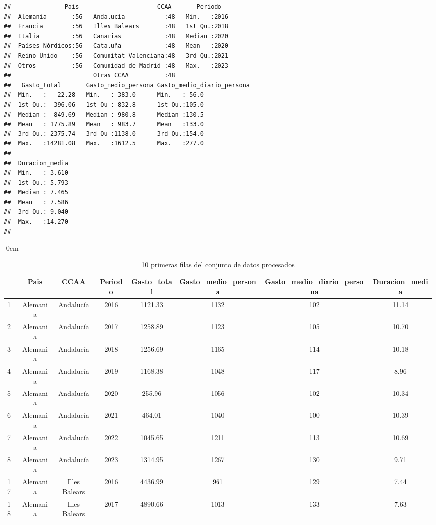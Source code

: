 \documentclass[data,article,submit,moreauthors,pdftex]{Definitions/mdpi}
\begin{document}
\begin{verbatim}
##               Pais                      CCAA       Periodo    
##  Alemania       :56   Andalucía           :48   Min.   :2016  
##  Francia        :56   Illes Balears       :48   1st Qu.:2018  
##  Italia         :56   Canarias            :48   Median :2020  
##  Países Nórdicos:56   Cataluña            :48   Mean   :2020  
##  Reino Unido    :56   Comunitat Valenciana:48   3rd Qu.:2021  
##  Otros          :56   Comunidad de Madrid :48   Max.   :2023  
##                       Otras CCAA          :48                 
##   Gasto_total       Gasto_medio_persona Gasto_medio_diario_persona
##  Min.   :   22.28   Min.   : 383.0      Min.   : 56.0             
##  1st Qu.:  396.06   1st Qu.: 832.8      1st Qu.:105.0             
##  Median :  849.69   Median : 980.8      Median :130.5             
##  Mean   : 1775.89   Mean   : 983.7      Mean   :133.0             
##  3rd Qu.: 2375.74   3rd Qu.:1138.0      3rd Qu.:154.0             
##  Max.   :14281.08   Max.   :1612.5      Max.   :277.0             
##                                                                   
##  Duracion_media  
##  Min.   : 3.610  
##  1st Qu.: 5.793  
##  Median : 7.465  
##  Mean   : 7.586  
##  3rd Qu.: 9.040  
##  Max.   :14.270  
## 
\end{verbatim}

\begin{table}[H]

\caption{\label{tab:unnamed-chunk-27} 10 primeras filas del conjunto de datos procesados}
             \begin{adjustwidth}{-\extralength}{0cm}
             \small
\begin{tabular}[t]{lccccccc}
\toprule
  & Pais & CCAA & Periodo & Gasto\_total & Gasto\_medio\_persona & Gasto\_medio\_diario\_persona & Duracion\_media\\
\midrule
1 & Alemania & Andalucía & 2016 & 1121.33 & 1132 & 102 & 11.14\\
2 & Alemania & Andalucía & 2017 & 1258.89 & 1123 & 105 & 10.70\\
3 & Alemania & Andalucía & 2018 & 1256.69 & 1165 & 114 & 10.18\\
4 & Alemania & Andalucía & 2019 & 1168.38 & 1048 & 117 & 8.96\\
5 & Alemania & Andalucía & 2020 & 255.96 & 1056 & 102 & 10.34\\
6 & Alemania & Andalucía & 2021 & 464.01 & 1040 & 100 & 10.39\\
7 & Alemania & Andalucía & 2022 & 1045.65 & 1211 & 113 & 10.69\\
8 & Alemania & Andalucía & 2023 & 1314.95 & 1267 & 130 & 9.71\\
17 & Alemania & Illes Balears & 2016 & 4436.99 & 961 & 129 & 7.44\\
18 & Alemania & Illes Balears & 2017 & 4890.66 & 1013 & 133 & 7.63\\
\bottomrule
\end{tabular}
    \end{adjustwidth}
\end{table}
\end{document}
